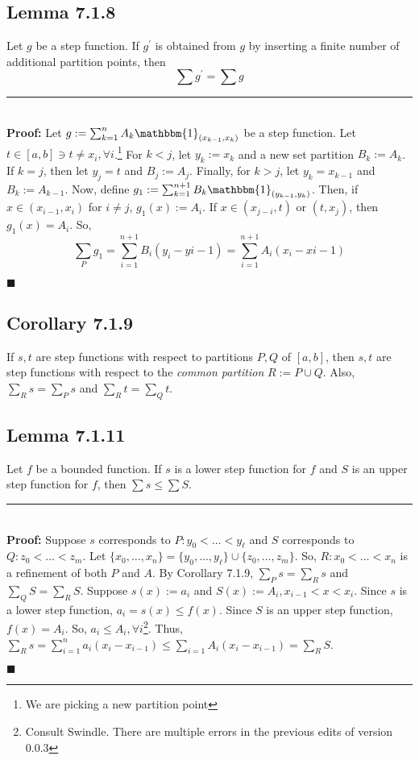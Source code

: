\documentclass[11pt]{book}
\newcommand{\horline}{\noindent\rule{14.25cm}{0.6pt}\\}
\newcommand{\QED}{\begin{flushright}$\blacksquare$\end{flushright}}
\begin{document}
		\subsection{Lemma 7.1.8}
		\label{subsec:lemm718}
			\begin{lemm}
				Let $g$ be a step function. If $g^{\prime}$ is obtained from $g$ by inserting a finite number of additional partition points, then
				$$\sum g^{\prime} = \sum g$$
				\horline
				\textbf{Proof:} Let $g:= \sum_{k = 1}^n{A_k \mathbbm{1}_{(x_{k-1}, x_k)}}$ be a step function. Let $t \in [a,b] \ni t \neq x_i, \forall i$.\footnote{We are picking 
				a new partition point} For $k < j$, let $y_k := x_k$ and a new set partition $B_k := A_k$. If $k = j$, then let $y_j = t$ and $B_j := A_j$. Finally, for 
				$k > j$, let $y_k = x_{k-1}$ and $B_k := A_{k-1}$. Now, define $g_1 := \sum_{k=1}^{n+1}B_k \mathbbm{1}_{(y_{k-1}, y_k)}$. Then, if $x \in (x_{i-1}, x_i)$ for $i \neq j$, 
				$g_1(x) := A_i$. If $x \in (x_{j - i}, t)$ or $(t, x_j)$, then $g_1(x) = A_i$. So, 
				$$\sum_{P}{g_1} = \sum_{i = 1}^{n+1}{B_i(y_i - y{i-1})} =  \sum_{i = 1}^{n+1}{A_i(x_i - x{i-1})}$$
				\QED
			\end{lemm}

		\subsection{Corollary 7.1.9}
		\label{subsec:cor719}
			\begin{cor}
				If $s,t$ are step functions with respect to partitions $P,Q$ of $[a,b]$, then $s,t$ are step functions with respect to the \emph{common partition} $R := P \cup Q$. 
				Also, $\sum_R s = \sum_P s$ and $\sum_R t = \sum_Q t$.
			\end{cor}

		\subsection{Lemma 7.1.11}
		\label{subsec:lemm7111}
			\begin{lemm}
				Let $f$ be a bounded function. If $s$ is a lower step function for $f$ and $S$ is an upper step function for $f$, then $\sum s \leq \sum S$.\hfill\break
				\horline
				\textbf{Proof:} Suppose $s$ corresponds to $P: y_0 < \dots < y_{\ell}$ and $S$ corresponds to $Q: z_0 < \dots < z_m$. Let $\{x_0, \dots , x_n\} = \{y_0,\dots,y_{\ell}\}
				\cup \{z_0, \dots , z_m\}$. So, $R: x_0 < \dots < x_n$ is a refinement of both $P$ and $A$. By Corollary 7.1.9, $\sum_P s = \sum_R s$ and $\sum_Q S = \sum_R S$.
				Suppose $s(x) := a_i$ and $S(x) := A_i, x_{i-1} < x < x_i$. Since $s$ is a lower step function, $a_i = s(x) \leq f(x)$. Since $S$ is an upper step function,
				$f(x) = A_i$. So, $a_i \leq A_i, \forall i$\footnote{Consult Swindle. There are multiple errors in the previous edits of version 0.0.3}. Thus, 
				$\sum_R s = \sum_{i=1}^n{a_i(x_i - x_{i-1})} \leq \sum_{i=1}{A_i(x_i - x_{i-1})} = \sum_R S$.
				\QED
			\end{lemm}
\end{document}
